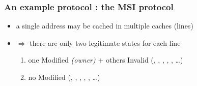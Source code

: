 \documentclass[12pt,dvipdfmx]{beamer}
\newcommand{\ao}[1]{{\color{blue}#1}}
\begin{document}
\begin{frame}
\frametitle{An example protocol : the MSI protocol}
\begin{itemize}

\item<2-> a single address may be cached in multiple 
  caches (lines)

\item<3-> $\Rightarrow$ there are only two legitimate states for each line
  \begin{enumerate}
  \item<3-> one Modified \ao{\em (owner)} 
    $+$ others Invalid (\Ibox , \Mbox , \Ibox , \Ibox , \Ibox , \ldots)
  \item<4-> no Modified (\Shbox , \Ibox , \Shbox , \Shbox , \Ibox , \ldots)
  \end{enumerate}
\end{itemize}

\begin{center}
%
%
%
%
\end{center}

\end{frame}
\end{document}
